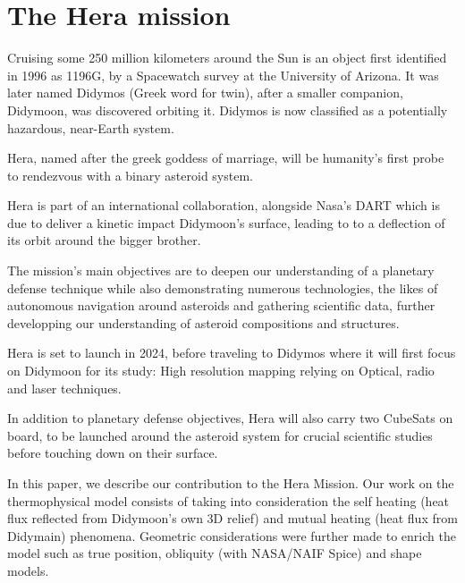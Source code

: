 \section{The Hera mission}
\label{intro}
Cruising some 250 million kilometers around the Sun is an object first identified in 1996 as 1196G, by a Spacewatch survey at the  University of Arizona. It was later named Didymos (Greek word for twin), after a smaller companion, Didymoon, was discovered orbiting it. Didymos is now classified  as a potentially hazardous, near-Earth system. 

Hera, named after the greek goddess of marriage, will be humanity's first probe to rendezvous with a binary asteroid system. 

Hera is part of an international collaboration, alongside Nasa's DART which is due to deliver a kinetic impact Didymoon's surface, leading to to a deflection of its orbit around the bigger brother.  

The mission's main objectives are to deepen our understanding of a planetary defense technique while also demonstrating numerous technologies, the likes of autonomous navigation around asteroids and gathering scientific data, further developping our understanding of asteroid compositions and structures. 

Hera is set to launch in 2024, before traveling to Didymos where it will first focus on Didymoon for its study: High resolution mapping relying on Optical, radio and laser techniques. 

In addition to planetary defense objectives, Hera will also carry two CubeSats on board, to be launched around the asteroid system for crucial scientific studies before touching down on their surface. 

In this paper, we describe our contribution to the Hera Mission. Our work on the thermophysical model consists of taking into consideration the self heating (heat flux reflected from Didymoon's own 3D relief) and mutual heating (heat flux from Didymain) phenomena. Geometric considerations were further made to enrich the model such as true position, obliquity (with NASA/NAIF Spice) and shape models.  
